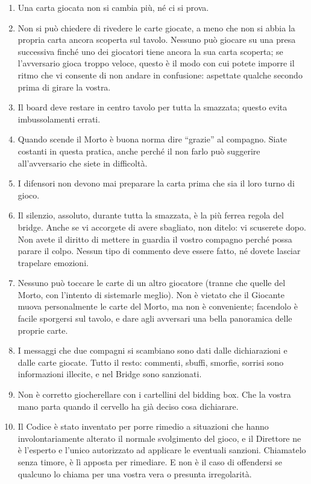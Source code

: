 \documentclass[../corsofiori.tex]{subfiles}
\begin{document}
\begin{enumerate}
\item Una carta giocata non si cambia più, né ci si prova.
\item Non si può chiedere di rivedere le carte giocate, a meno che non si abbia la propria carta ancora scoperta sul tavolo. Nessuno può giocare su una presa successiva finché uno dei giocatori tiene ancora la sua carta scoperta; se l’avversario gioca troppo veloce, questo è il modo con cui potete imporre il ritmo che vi consente di non andare in confusione: aspettate qualche secondo prima di girare la vostra.
\item Il board deve restare in centro tavolo per tutta la smazzata; questo evita imbussolamenti errati.
\item Quando scende il Morto è buona norma dire “grazie” al compagno. Siate costanti in questa pratica, anche perché il
    non farlo può suggerire all'avversario che siete in difficoltà.
\item I difensori non devono mai preparare la carta prima che sia il loro turno di gioco.
\item Il silenzio, assoluto, durante tutta la smazzata, è la più ferrea regola del bridge.  Anche se vi accorgete di avere sbagliato, non ditelo: vi scuserete dopo. Non avete il diritto di mettere in guardia il vostro compagno perché possa parare il colpo. Nessun tipo di commento deve essere fatto, né dovete lasciar trapelare emozioni.
\item Nessuno può toccare le carte di un altro giocatore (tranne che quelle del Morto, con l’intento di sistemarle meglio). Non è vietato che il Giocante muova personalmente le carte del Morto, ma non è conveniente; facendolo è facile sporgersi sul tavolo, e dare agli avversari una bella panoramica delle proprie carte.
\item I messaggi che due compagni si scambiano sono dati dalle dichiarazioni e dalle carte giocate. Tutto il resto: commenti, sbuffi, smorfie, sorrisi sono informazioni illecite, e nel Bridge sono sanzionati.
\item Non è corretto giocherellare con i cartellini del bidding box. Che la vostra mano parta quando il cervello ha già deciso cosa dichiarare.
\item Il Codice è stato inventato per porre rimedio a situazioni che hanno involontariamente alterato il normale svolgimento del gioco, e il Direttore ne è l'esperto e l'unico autorizzato ad applicare le eventuali sanzioni. Chiamatelo senza timore, è lì apposta per rimediare. E non è il caso di offendersi se qualcuno lo chiama per una vostra vera o presunta irregolarità.

\end{enumerate}
\end{document}
